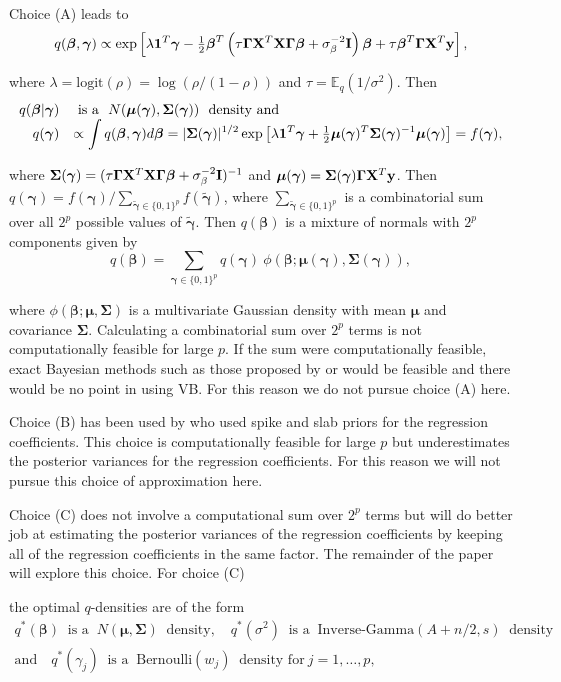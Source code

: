 \documentclass[11pt]{article}
\newtheorem{Main Result}{Main Result}
\def\vectorfontone{\bf}
\def\vectorfonttwo{\boldsymbol}
\def\vy{{\vectorfontone y}}                      %
\def\vone{{\vectorfontone 1}}
\def\vbeta{{\vectorfonttwo \beta}}               %
\def\vgamma{{\vectorfonttwo \gamma}}             %
\def\vmu{{\vectorfonttwo \mu}}                   %
\def\matrixfontone{\bf}
\def\matrixfonttwo{\boldsymbol}
\def\mI{{\matrixfontone I}}                      %
\def\mX{{\matrixfontone X}}                      %
\def\mGamma{{\matrixfonttwo \Gamma}}             %
\def\mSigma{{\matrixfonttwo \Sigma}}             %
\def\vmuq{{\vmu}}
\def\mSigmaq{{\mSigma}}
\def\Aq{{A+n/2}}
\def\Bq{{s}}
\def\bE{{\mathbb E}}                             %
\def\ds{\displaystyle}
\begin{document}
{Choice (A) leads to
$$
q(\vbeta,\vgamma) \propto \exp\left[ 
\lambda \vone^T\vgamma - \tfrac{1}{2} \vbeta^T \left(\tau\mGamma\mX^T\mX\mGamma\vbeta  + \sigma_\beta^{-2}\mI \right)\vbeta
+ \tau \vbeta^T\mGamma\mX^T\vy  
\right],
$$

\noindent where $\lambda = \mbox{logit}(\rho) = \log(\rho/(1-\rho))$ and
$\tau = \bE_q(1/\sigma^2)$. Then
$$
\begin{array}{rl}
\ds q(\vbeta|\vgamma) 
    & \mbox{ is a } \ N(\vmu(\vgamma), \mSigma(\vgamma))   \ \mbox{ density and }
    \\
\ds q(\vgamma) 
    & \ds \propto \int q(\vbeta,\vgamma) d\vbeta = |\mSigma(\vgamma)|^{1/2}\exp\left[ 
\lambda \vone^T\vgamma + \tfrac{1}{2} \vmu(\vgamma)^T\mSigma(\vgamma)^{-1}\vmu(\vgamma)  \right] = f(\vgamma),
\end{array}
$$

\noindent where 
$\mSigma(\vgamma) = (\tau\mGamma\mX^T\mX\mGamma\vbeta  + \sigma_\beta^{-2}\mI)^{-1}$
and $\vmu(\vgamma) = \mSigma(\vgamma) \mGamma\mX^T\vy$. Then 
$q(\vgamma) = f(\vgamma)/\sum_{\widetilde{\vgamma} \in \{0,1\}^p} f(\widetilde{\vgamma})$,
where $\sum_{\widetilde{\vgamma} \in \{0,1\}^p}$ is a combinatorial sum over all $2^p$ possible
values of $\widetilde{\vgamma}$. Then $q(\vbeta)$ is a mixture of normals with $2^p$
components given by
$$
q(\vbeta) = \sum_{\vgamma \in \{0,1\}^p} q(\vgamma) \ \phi(\vbeta;\vmu(\vgamma), \mSigma(\vgamma)),
$$ 

\noindent where $\phi(\vbeta; \vmu, \mSigma)$ is a multivariate Gaussian
density with mean $\vmu$ and covariance $\mSigma$. Calculating a
combinatorial sum over $2^p$  terms is not computationally feasible for large $p$.
If the sum were computationally feasible, exact
Bayesian methods such as those proposed by \cite{Liang2008} or 
\cite{Maruyama2011} would be feasible and there would be no point in using VB. 
For this reason we do not pursue choice (A) here.

Choice (B) has been used by \cite{Carbonetto2011} who used spike and
slab priors for the regression coefficients. This choice is computationally
feasible for large $p$ but underestimates the posterior variances for the 
regression coefficients. For this reason we will not pursue this choice of
approximation here.

Choice (C) does not involve a computational sum over $2^p$ terms but will do 
better job at estimating the posterior variances of the regression coefficients
by keeping all of the regression coefficients in the same factor. The remainder
of the paper will explore this choice. For choice (C)}
the optimal $q$-densities are of the form
$$
\begin{array}{c}
q^{\ast}(\vbeta) \ \mbox{ is a } \ N(\vmuq,\mSigmaq) \ \mbox{ density}, \quad
q^{\ast}(\sigma^2) \ \mbox{ is a } \ \mbox{Inverse-Gamma}(\Aq,\Bq) \ \mbox{ density} \\ [1ex]
\mbox{and} \quad
q^{\ast}(\gamma_j)  \ \mbox{ is a } \  \mbox{Bernoulli}(w_j) \ \mbox{ density for} \ j=1,\ldots,p,
\end{array}
$$
\end{document}
